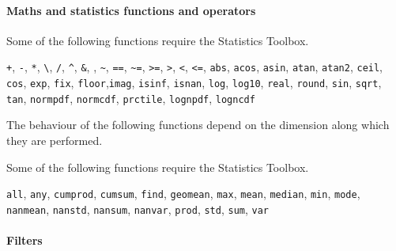  \paragraph{Maths and statistics functions and operators}
 
 Some of the following functions require the Statistics Toolbox.
 
 \texttt{+}, \texttt{-}, \texttt{*}, \texttt{\textbackslash{}},
 \texttt{/}, \texttt{\^{}}, \texttt{\&}, \texttt{\textbar{}},
 \texttt{\textasciitilde{}}, \texttt{==}, \texttt{\textasciitilde{}=},
 \texttt{\textgreater{}=}, \texttt{\textgreater{}}, \texttt{\textless{}},
 \texttt{\textless{}=}, \texttt{abs}, \texttt{acos}, \texttt{asin},
 \texttt{atan}, \texttt{atan2}, \texttt{ceil}, \texttt{cos},
 \texttt{exp}, \texttt{fix}, \texttt{floor},\texttt{imag},
 \texttt{isinf}, \texttt{isnan}, \texttt{log}, \texttt{log10},
 \texttt{real}, \texttt{round}, \texttt{sin}, \texttt{sqrt},
 \texttt{tan}, \texttt{normpdf}, \texttt{normcdf}, \texttt{prctile},
 \texttt{lognpdf}, \texttt{logncdf}
 
 The behaviour of the following functions depend on the dimension along
 which they are performed.
 
 Some of the following functions require the Statistics Toolbox.
 
 \texttt{all}, \texttt{any}, \texttt{cumprod}, \texttt{cumsum},
 \texttt{find}, \texttt{geomean}, \texttt{max}, \texttt{mean},
 \texttt{median}, \texttt{min}, \texttt{mode}, \texttt{nanmean},
 \texttt{nanstd}, \texttt{nansum}, \texttt{nanvar}, \texttt{prod},
 \texttt{std}, \texttt{sum}, \texttt{var}
 
 \paragraph{Filters}
 
